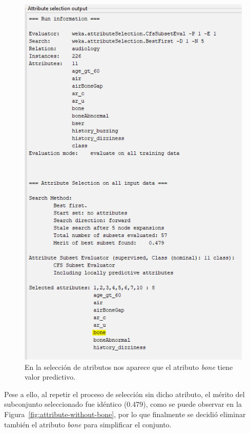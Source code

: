 \documentclass{article}
\begin{document}
\begin{figure}[!ht]
    \centering
    \includegraphics[width=0.8\linewidth]{Imágenes/bone-attribute-search.png}
    \caption{En la selección de atributos nos aparece que el atributo \textit{bone} tiene valor predictivo.}
    \label{fig:bone-subset}
\end{figure}

\newpage
Pese a ello, al repetir el proceso de selección sin dicho atributo, el mérito del subconjunto seleccionado fue idéntico (0.479), como se puede observar en la Figura~\ref{fig:attribute-without-bone}, por lo que finalmente se decidió eliminar también el atributo \textit{bone} para simplificar el conjunto.
\end{document}
